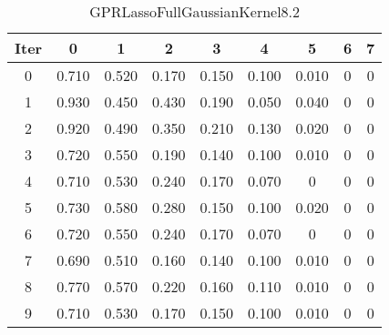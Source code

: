 \begin{table}
	\begin{center}
		\begin{tabular}{|c|c|c|c|c|c|c|c|c|}
			\hline
			Iter & 0 & 1 & 2 & 3 & 4 & 5 & 6 & 7 \\
			\hline
			0 & 0.710 & 0.520 & 0.170 & 0.150 & 0.100 & 0.010 & 0 & 0 \\
			\hline
			1 & 0.930 & 0.450 & 0.430 & 0.190 & 0.050 & 0.040 & 0 & 0 \\
			\hline
			2 & 0.920 & 0.490 & 0.350 & 0.210 & 0.130 & 0.020 & 0 & 0 \\
			\hline
			3 & 0.720 & 0.550 & 0.190 & 0.140 & 0.100 & 0.010 & 0 & 0 \\
			\hline
			4 & 0.710 & 0.530 & 0.240 & 0.170 & 0.070 & 0 & 0 & 0 \\
			\hline
			5 & 0.730 & 0.580 & 0.280 & 0.150 & 0.100 & 0.020 & 0 & 0 \\
			\hline
			6 & 0.720 & 0.550 & 0.240 & 0.170 & 0.070 & 0 & 0 & 0 \\
			\hline
			7 & 0.690 & 0.510 & 0.160 & 0.140 & 0.100 & 0.010 & 0 & 0 \\
			\hline
			8 & 0.770 & 0.570 & 0.220 & 0.160 & 0.110 & 0.010 & 0 & 0 \\
			\hline
			9 & 0.710 & 0.530 & 0.170 & 0.150 & 0.100 & 0.010 & 0 & 0 \\
			\hline
		\end{tabular}
	\end{center}
	\caption{GPRLassoFullGaussianKernel8.2}
\end{table}